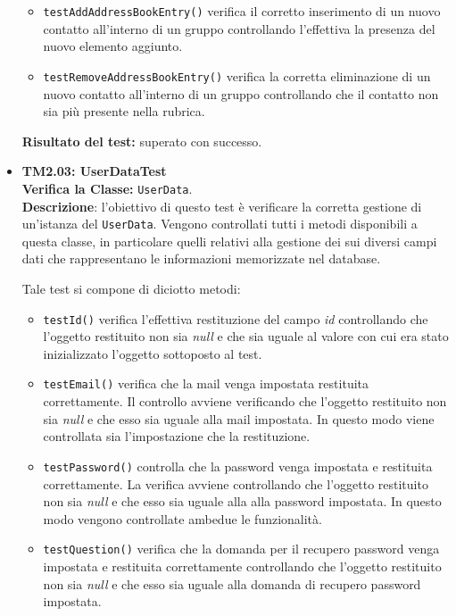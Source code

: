 \begin{itemize}
\begin{itemize}
\item \texttt{testAddAddressBookEntry()} verifica il corretto inserimento di un nuovo contatto all'interno di un gruppo controllando l'effettiva la presenza del nuovo elemento aggiunto.

\item \texttt{testRemoveAddressBookEntry()}  
verifica la corretta eliminazione di un nuovo contatto all'interno di un gruppo controllando che il contatto non sia più presente nella rubrica.

\end{itemize}
\textbf{Risultato del test:} superato con successo.

\item[\passed] \textbf{TM2.03: UserDataTest}\\
\textbf{Verifica la Classe:} \texttt{UserData}.\\
\textbf{Descrizione}: l'obiettivo di questo test è verificare la corretta gestione di un'istanza del  \texttt{UserData}. Vengono controllati tutti i metodi disponibili a questa classe, in particolare quelli relativi alla gestione dei sui diversi campi dati che rappresentano le informazioni memorizzate nel database.

Tale test si compone di diciotto metodi:
\begin{itemize}

\item \texttt{testId()} verifica l'effettiva restituzione del campo \textit{id} controllando che l'oggetto restituito non sia \textit{null} e che sia uguale al valore con cui era stato inizializzato l'oggetto sottoposto al test.

\item \texttt{testEmail()} verifica che la mail venga impostata restituita correttamente. Il controllo avviene verificando che l'oggetto restituito non sia \textit{null} e che esso sia uguale alla mail impostata. In questo modo viene controllata sia l'impostazione che la restituzione. 

\item \texttt{testPassword()} controlla che la password venga impostata e restituita correttamente. La verifica avviene controllando che l'oggetto restituito non sia \textit{null} e che esso sia uguale alla alla password impostata. In questo modo vengono controllate ambedue le funzionalità.

\item \texttt{testQuestion()} verifica che la domanda per il recupero password venga impostata e restituita correttamente controllando che l'oggetto restituito non sia \textit{null} e che esso sia uguale alla domanda di recupero password impostata.


\end{itemize}
\end{itemize}
